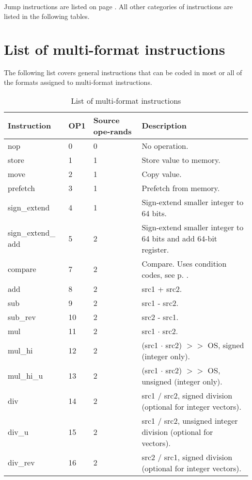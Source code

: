 \documentclass[forwardcom.tex]{subfiles}
\begin{document}
Jump instructions are listed on page \pageref{table:controlTransferInstructions}. All other categories of instructions are listed in the following tables.


\section{List of multi-format instructions}
The following list covers general instructions that can be coded in most or all of the formats
assigned to multi-format instructions.

\begin{longtable} {|p{25mm}|p{12mm}|p{12mm}|p{100mm}|}
\caption{
List of multi-format instructions} 
\label{table:ListOfMultiFormatInstructions} \\
\endfirsthead
\endhead
\hline
\bfseries Instruction & \bfseries OP1 & \bfseries Source ope-rands & \bfseries Description \\
\hline
nop          &  0 & 0 & No operation. \\
store        &  1 & 1 & Store value to memory. \\
move         &  2 & 1 & Copy value. \\
prefetch     &  3 & 1 & Prefetch from memory. \\
sign\_extend &  4 & 1 & Sign-extend smaller integer to 64 bits. \\
sign\_extend\_ add & 5 & 2 & Sign-extend smaller integer to 64 bits and add 64-bit register. \\
compare      &  7 & 2 & Compare. Uses condition codes, see p. \pageref{table:conditionCodesForCompareInstruction}. \\
add          &  8 & 2 & src1 + src2. \\
sub          &  9 & 2 & src1 - src2. \\
sub\_rev     & 10 & 2 & src2 - src1. \\
mul          & 11 & 2 & src1 $\cdot$ src2. \\ 
mul\_hi      & 12 & 2 & (src1 $\cdot$ src2) $>>$ OS, signed (integer only). \\
mul\_hi\_u   & 13 & 2 & (src1 $\cdot$ src2) $>>$ OS, unsigned (integer only). \\
div          & 14 & 2 & src1 / src2, signed division (optional for integer vectors). \\
div\_u       & 15 & 2 & src1 / src2, unsigned integer division (optional for vectors). \\
div\_rev     & 16 & 2 & src2 / src1, signed division (optional for integer vectors). \\

\end{longtable}
\end{document}

